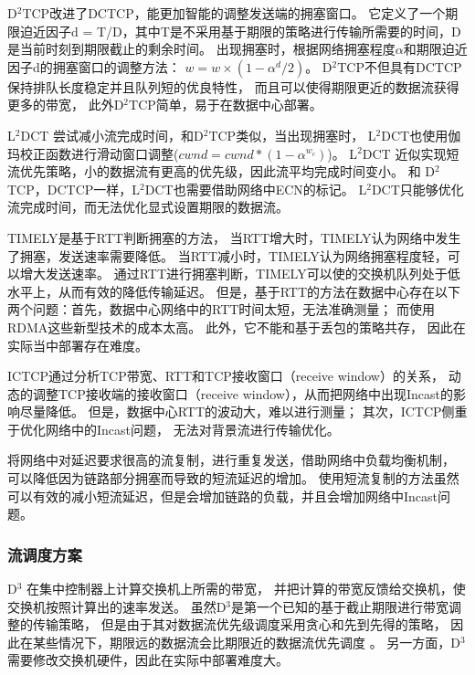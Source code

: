  D$^2$TCP改进了DCTCP，能更加智能的调整发送端的拥塞窗口。
 它定义了一个期限迫近因子d = T/D，其中T是不采用基于期限的策略进行传输所需要的时间，D是当前时刻到期限截止的剩余时间。
 出现拥塞时，根据网络拥塞程度$\alpha$和期限迫近因子d的拥塞窗口的调整方法：
$w=w \times (1-\alpha^{d}/2)$。
D$^2$TCP不但具有DCTCP保持排队长度稳定并且队列短的优良特性，
 而且可以使得期限更近的数据流获得更多的带宽，
 此外D$^2$TCP简单，易于在数据中心部署。
 
L$^2$DCT \cite{L2DCT} 尝试减小流完成时间，和D$^2$TCP类似，当出现拥塞时，
L$^2$DCT也使用伽玛校正函数进行滑动窗口调整($cwnd = cwnd*(1-\alpha^{w_c})$)。
L$^2$DCT 近似实现短流优先策略，小的数据流有更高的优先级，因此流平均完成时间变小。
和 D$^2$TCP，DCTCP一样，L$^2$DCT也需要借助网络中ECN的标记。
L$^2$DCT只能够优化流完成时间，而无法优化显式设置期限的数据流。
 
  
TIMELY\cite{mittal2015timely}是基于RTT判断拥塞的方法，
当RTT增大时，TIMELY认为网络中发生了拥塞，发送速率需要降低。
当RTT减小时，TIMELY认为网络拥塞程度轻，可以增大发送速率。
通过RTT进行拥塞判断，TIMELY可以使的交换机队列处于低水平上，从而有效的降低传输延迟。
但是，基于RTT的方法在数据中心存在以下两个问题：首先，数据中心网络中的RTT时间太短，无法准确测量；
而使用RDMA这些新型技术的成本太高。
此外，它不能和基于丢包的策略共存，
因此在实际当中部署存在难度。

ICTCP\cite{ICTCP}通过分析TCP带宽、RTT和TCP接收窗口（receive window）的关系，
动态的调整TCP接收端的接收窗口（receive window），从而把网络中出现Incast的影响尽量降低。
但是，数据中心RTT的波动大，难以进行测量；
其次，ICTCP侧重于优化网络中的Incast问题，
无法对背景流进行传输优化。

 将网络中对延迟要求很高的流复制，进行重复发送，借助网络中负载均衡机制，
可以降低因为链路部分拥塞而导致的短流延迟的增加。
使用短流复制的方法虽然可以有效的减小短流延迟，但是会增加链路的负载，并且会增加网络中Incast问题。

\subsubsection{流调度方案}
 
D$^{3}$ \cite{D3}在集中控制器上计算交换机上所需的带宽，
并把计算的带宽反馈给交换机，使交换机按照计算出的速率发送。
虽然D$^{3}$是第一个已知的基于截止期限进行带宽调整的传输策略，
但是由于其对数据流优先级调度采用贪心和先到先得的策略，
因此在某些情况下，期限远的数据流会比期限近的数据流优先调度 \cite{D3}。
另一方面，D$^{3}$ 需要修改交换机硬件，因此在实际中部署难度大。

